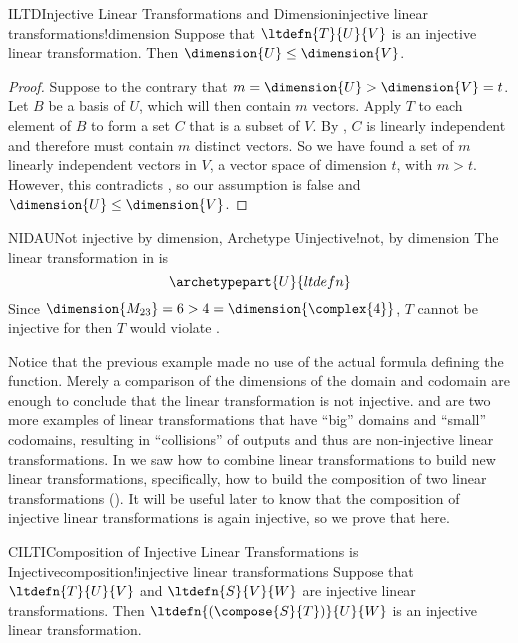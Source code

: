 %
%
\begin{theorem}{ILTD}{Injective Linear Transformations and Dimension}{injective linear transformations!dimension}
Suppose that $\ltdefn{T}{U}{V}$ is an injective linear transformation.  Then $\dimension{U}\leq\dimension{V}$.
\end{theorem}
%
\begin{proof}
%
Suppose to the contrary that $m=\dimension{U}>\dimension{V}=t$.  Let $B$ be  a basis of $U$, which will then contain $m$ vectors.  Apply $T$ to each element of $B$ to form a set $C$ that is a subset of $V$.  By , $C$ is linearly independent and therefore must contain $m$ distinct vectors.  So we have found a set of $m$ linearly independent vectors in $V$, a vector space of dimension $t$, with $m>t$.  However, this contradicts , so our assumption is false and $\dimension{U}\leq\dimension{V}$.
%
\end{proof}
%
\begin{example}{NIDAU}{Not injective by dimension, Archetype U}{injective!not, by dimension}
The linear transformation in  is 
%
\begin{equation*}
\archetypepart{U}{ltdefn}
\end{equation*}
%
Since $\dimension{M_{23}}=6>4=\dimension{\complex{4}}$, $T$ cannot be injective for then $T$ would violate .
%
\end{example}
%
Notice that the previous example made no use of the actual formula defining the function.  Merely a comparison of the dimensions of the domain and codomain are enough to conclude that the linear transformation is not injective.   and  are two more examples of linear transformations that have ``big'' domains and ``small'' codomains, resulting in ``collisions'' of outputs and thus are non-injective linear transformations.
%
%
In  we saw how to combine linear transformations to build new linear transformations, specifically, how to build the composition of two linear transformations ().  It will be useful later to know that the composition of injective linear transformations is again injective, so we prove that here.
%
\begin{theorem}{CILTI}{Composition of Injective Linear Transformations is Injective}{composition!injective linear transformations}
Suppose that $\ltdefn{T}{U}{V}$ and $\ltdefn{S}{V}{W}$ are injective linear transformations.  Then $\ltdefn{(\compose{S}{T})}{U}{W}$ is an injective linear transformation.
\end{theorem}
